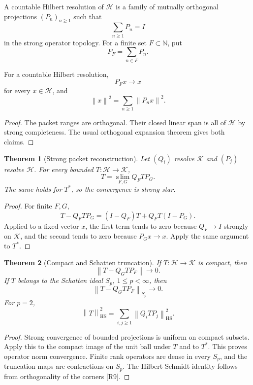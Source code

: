 \documentclass{aomart}
\newtheorem{theorem}{Theorem}[section]
\theoremstyle{definition}
\theoremstyle{remark}
\newcommand{\NN}{\mathbb N}
\newcommand{\K}{\mathcal K}
\newcommand{\Hh}{\mathcal H}
\newcommand{\norm}[1]{\left\lVert#1\right\rVert}
\newcommand{\Rcite}[1]{\textup{[#1]}}
\begin{document}
\begin{definition}\label{def:countable_resolution}
A countable Hilbert resolution of \(\Hh\) is a family of mutually orthogonal projections \((P_n)_{n\ge1}\) such that
\[
 \sum_{n\ge1}P_n=I
\]
in the strong operator topology. For a finite set \(F\subset\NN\), put
\[
 P_F=\sum_{n\in F}P_n.
\]
\end{definition}

\begin{lemma}\label{lem:strong_packet_sum}
For a countable Hilbert resolution,
\[
 P_Fx\longrightarrow x
\]
for every \(x\in\Hh\), and
\[
 \norm{x}^2
 =
 \sum_{n\ge1}\norm{P_nx}^2.
\]
\end{lemma}

\begin{proof}
The packet ranges are orthogonal. Their closed linear span is all of \(\Hh\) by strong completeness. The usual orthogonal expansion theorem gives both claims.
\end{proof}

\begin{theorem}[Strong packet reconstruction]\label{thm:strong_reconstruction}
Let \((Q_i)\) resolve \(\K\) and \((P_j)\) resolve \(\Hh\). For every bounded \(T:\Hh\to\K\),
\[
 \boxed{
 T
 =
 \operatorname*{s\!\!\lim}_{F,G}
 Q_FTP_G.
 }
\]
The same holds for \(T^*\), so the convergence is strong star.
\end{theorem}

\begin{proof}
For finite \(F,G\),
\[
 T-Q_FTP_G
 =
 (I-Q_F)T+Q_FT(I-P_G).
\]
Applied to a fixed vector \(x\), the first term tends to zero because \(Q_F\to I\) strongly on \(\K\), and the second tends to zero because \(P_Gx\to x\). Apply the same argument to \(T^*\).
\end{proof}

\begin{theorem}[Compact and Schatten truncation]\label{thm:compact_truncation}
If \(T:\Hh\to\K\) is compact, then
\[
 \norm{T-Q_GTP_F}\longrightarrow0.
\]
If \(T\) belongs to the Schatten ideal \(S_p\), \(1\le p<\infty\), then
\[
 \norm{T-Q_GTP_F}_{S_p}\longrightarrow0.
\]
For \(p=2\),
\[
 \boxed{
 \norm{T}_{\mathrm{HS}}^2
 =
 \sum_{i,j\ge1}\norm{Q_iTP_j}_{\mathrm{HS}}^2.
 }
\]
\end{theorem}

\begin{proof}
Strong convergence of bounded projections is uniform on compact subsets. Apply this to the compact image of the unit ball under \(T\) and to \(T^*\). This proves operator norm convergence. Finite rank operators are dense in every \(S_p\), and the truncation maps are contractions on \(S_p\). The Hilbert Schmidt identity follows from orthogonality of the corners \Rcite{R9}.
\end{proof}
\end{document}
